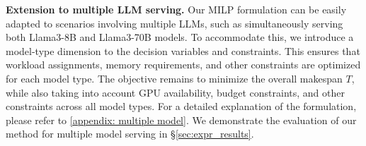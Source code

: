 \label{sec:multi model}
\textbf{Extension to multiple LLM serving.} Our MILP formulation can be easily adapted to scenarios involving multiple LLMs, such as simultaneously serving both Llama3-8B and Llama3-70B models. To accommodate this, we introduce a model-type dimension to the decision variables and constraints. This ensures that workload assignments, memory requirements, and other constraints are optimized for each model type. The objective remains to minimize the overall makespan $T$, while also taking into account GPU availability, budget constraints, and other constraints across all model types. For a detailed explanation of the formulation, please refer to \autoref{appendix: multiple model}. We demonstrate the evaluation of our method for multiple model serving in \S\ref{sec:expr_results}.